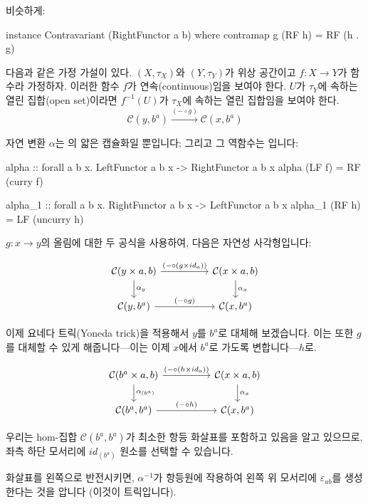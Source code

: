 \documentclass[DaoFP]{subfiles}
\begin{document}
비슷하게:
\begin{haskell}
instance Contravariant (RightFunctor a b) where
  contramap g (RF h) = RF (h . g)
\end{haskell}
다음과 같은 가정 가설이 있다. $(X, \tau_X)$와 $(Y, \tau_Y)$가 위상 공간이고 $f: X \to Y$가 함수라 가정하자.
이러한 함수 $f$가 연속(continuous)임을 보여야 한다.
$U$가 $\tau_Y$에 속하는 열린 집합(open set)이라면 $f^{-1}(U)$가 $\tau_X$에 속하는 열린 집합임을 보여야 한다.
\[  \mathcal{C}(y, b^a) \xrightarrow{ (- \circ g) } \mathcal{C}(x, b^a) \]

자연 변환 $\alpha$는 의 얇은 캡슐화일 뿐입니다; 그리고 그 역함수는 입니다:

\begin{haskell}
alpha :: forall a b x. LeftFunctor a b x -> RightFunctor a b x
alpha (LF f) = RF (curry f)
\end{haskell}

\begin{haskell}
alpha_1 :: forall a b x. RightFunctor a b x -> LeftFunctor a b x
alpha_1 (RF h) = LF (uncurry h)
\end{haskell}

$g \colon x \to y$의 올림에 대한 두 공식을 사용하여, 다음은 자연성 사각형입니다:

\[
 \begin{tikzcd}
 \mathcal{C}(y \times a, b)
 \arrow[rr, "(- \circ (g \times id_a))"]
 \arrow[d,  "\alpha_y"]
& &
\mathcal{C}(x \times a, b)
  \arrow[d, "\alpha_x"]
 \\
 \mathcal{C}(y, b^a)
 \arrow[rr, "(- \circ g)"]
& &
\mathcal{C}(x, b^a)
 \end{tikzcd}
\]

이제 요네다 트릭(Yoneda trick)을 적용해서 $y$를 $b^a$로 대체해 보겠습니다. 이는 또한 $g$를 대체할 수 있게 해줍니다---이는 이제 $x$에서 $b^a$로 가도록 변합니다---$h$로.

\[
 \begin{tikzcd}
 \mathcal{C}(b^a \times a, b)
 \arrow[rr, "(- \circ (h \times id_a))"]
 \arrow[d,  "\alpha_{(b^a)}"]
& &
\mathcal{C}(x \times a, b)
  \arrow[d,  "\alpha_x"]
 \\
 \mathcal{C}(b^a, b^a)
 \arrow[rr, "(- \circ h)"]
& &
\mathcal{C}(x, b^a)
 \end{tikzcd}
\]

우리는 hom-집합 $\mathcal{C}(b^a, b^a)$가 최소한 항등 화살표를 포함하고 있음을 알고 있으므로, 좌측 하단 모서리에 $id_{(b^a)}$ 원소를 선택할 수 있습니다.

화살표를 왼쪽으로 반전시키면, $\alpha^{-1}$가 항등원에 작용하여 왼쪽 위 모서리에 $\varepsilon_{a b}$를 생성한다는 것을 압니다 (이것이  트릭입니다).
\end{document}
